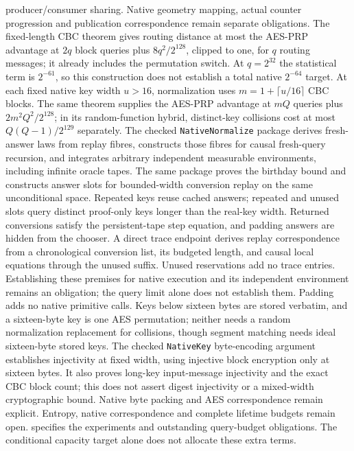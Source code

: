 \documentclass[11pt]{article}
\theoremstyle{definition}
\theoremstyle{remark}
\begin{document}
producer/consumer sharing. Native geometry mapping, actual counter progression
and publication correspondence remain separate obligations.
The fixed-length CBC theorem gives routing distance
at most the AES-PRP advantage at $2q$ block queries plus $8q^2/2^{128}$,
clipped to one, for $q$ routing messages; it already includes the permutation
switch. At $q=2^{32}$ the statistical term is $2^{-61}$, so this construction
does not establish a total native $2^{-64}$ target. At each fixed native key
width $u>16$, normalization uses $m=1+\lceil u/16\rceil$ CBC blocks. The same
theorem supplies the AES-PRP advantage at $mQ$ queries plus
$2m^2Q^2/2^{128}$; in its random-function hybrid, distinct-key collisions cost
at most $Q(Q-1)/2^{129}$ separately. The checked
\texttt{NativeNormalize} package derives fresh-answer laws from replay
fibres, constructs those fibres for causal fresh-query recursion, and integrates
arbitrary independent measurable environments, including infinite oracle tapes.
The same package proves the birthday bound and constructs answer slots for
bounded-width conversion replay on the same unconditional space. Repeated keys
reuse cached answers; repeated and unused slots query distinct proof-only keys
longer than the real-key width. Returned conversions satisfy the persistent-tape
step equation, and padding answers are hidden from the chooser. A direct trace
endpoint derives replay correspondence from a chronological conversion
list, its budgeted length, and causal local equations through the unused suffix.
Unused reservations add no trace entries. Establishing these premises for
native execution and its independent environment remains an obligation;
the query limit alone does not establish them. Padding adds
no native primitive calls. Keys below sixteen bytes are stored verbatim, and
a sixteen-byte key is one AES permutation; neither needs a random
normalization replacement for collisions, though segment matching needs ideal
sixteen-byte stored keys. The checked \texttt{NativeKey} byte-encoding argument
establishes injectivity at fixed width, using injective block encryption only at
sixteen bytes. It also proves long-key input-message injectivity
and the exact CBC block count; this does not assert digest injectivity or a
mixed-width cryptographic bound. Native byte packing and AES correspondence
remain explicit. Entropy,
native correspondence and complete lifetime budgets remain open.
 specifies the
experiments and outstanding query-budget obligations.
The conditional capacity target alone does not allocate these extra terms.
\end{document}

